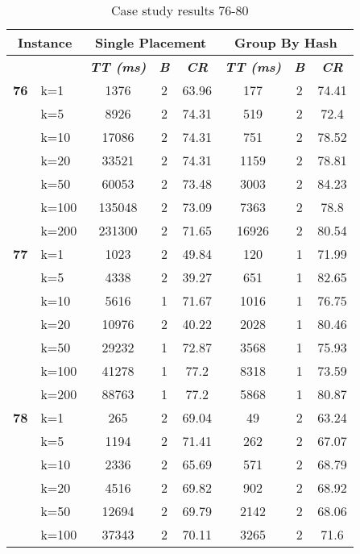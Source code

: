     \begin{table}[htbp]
    \caption{Case study results 76-80}
    \centering
    \begin{tabular}{|l|l|c|c|c|c|c|c|}
    \hline
    \multicolumn{ 2}{|c|}{\textbf{Instance}} & \multicolumn{ 3}{c|}{\textbf{Single Placement}} & \multicolumn{ 3}{c|}{\textbf{Group By Hash}} \\ \hline
    \multicolumn{ 2}{|l|}{} & \textbf{\textit{TT (ms)}} & \textbf{\textit{B}} & \textbf{\textit{CR}} & \textbf{\textit{TT (ms)}} & \textbf{\textit{B}} & \textbf{\textit{CR}} \\ \hline
    \multicolumn{1}{|r|}{\textbf{76}} & k=1 & 1376 & 2 & 63.96 & 177 & 2 & 74.41 \\ 
     & k=5 & 8926 & 2 & 74.31 & 519 & 2 & 72.4 \\ 
     & k=10 & 17086 & 2 & 74.31 & 751 & 2 & 78.52 \\ 
     & k=20 & 33521 & 2 & 74.31 & 1159 & 2 & 78.81 \\ 
     & k=50 & 60053 & 2 & 73.48 & 3003 & 2 & 84.23 \\ 
     & k=100 & 135048 & 2 & 73.09 & 7363 & 2 & 78.8 \\ 
     & k=200 & 231300 & 2 & 71.65 & 16926 & 2 & 80.54 \\ \hline
    \multicolumn{1}{|r|}{\textbf{77}} & k=1 & 1023 & 2 & 49.84 & 120 & 1 & 71.99 \\ 
     & k=5 & 4338 & 2 & 39.27 & 651 & 1 & 82.65 \\ 
     & k=10 & 5616 & 1 & 71.67 & 1016 & 1 & 76.75 \\ 
     & k=20 & 10976 & 2 & 40.22 & 2028 & 1 & 80.46 \\ 
     & k=50 & 29232 & 1 & 72.87 & 3568 & 1 & 75.93 \\ 
     & k=100 & 41278 & 1 & 77.2 & 8318 & 1 & 73.59 \\ 
     & k=200 & 88763 & 1 & 77.2 & 5868 & 1 & 80.87 \\ \hline
    \multicolumn{1}{|r|}{\textbf{78}} & k=1 & 265 & 2 & 69.04 & 49 & 2 & 63.24 \\ 
     & k=5 & 1194 & 2 & 71.41 & 262 & 2 & 67.07 \\ 
     & k=10 & 2336 & 2 & 65.69 & 571 & 2 & 68.79 \\ 
     & k=20 & 4516 & 2 & 69.82 & 902 & 2 & 68.92 \\ 
     & k=50 & 12694 & 2 & 69.79 & 2142 & 2 & 68.06 \\ 
     & k=100 & 37343 & 2 & 70.11 & 3265 & 2 & 71.6 \\ 

\end{tabular}
\end{table}
